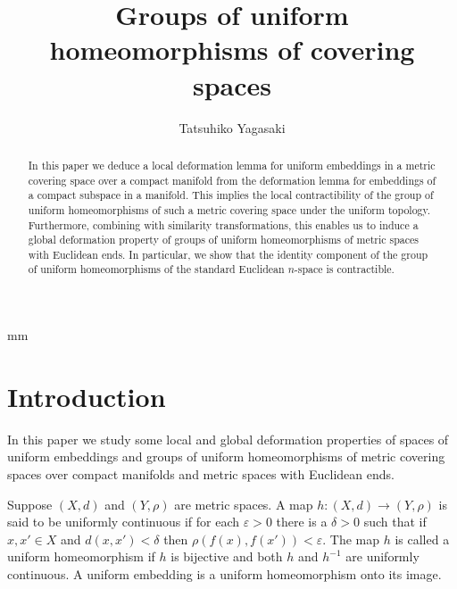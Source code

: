 \documentclass[11pt, fleqn]{amsart}
\theoremstyle{definition}
\newcommand{\e}{\varepsilon}
\begin{document}
 mm

\thispagestyle{empty}


\title[The groups of uniform homeomorphisms]{Groups of uniform homeomorphisms of covering spaces} 

\author[Tatsuhiko Yagasaki]{Tatsuhiko Yagasaki}
\address{Graduate School of Science and Technology, Kyoto Institute of Technology, Kyoto, 606-8585, Japan}


\maketitle

\begin{abstract} 
In this paper we deduce a local deformation lemma for uniform embeddings in a metric covering space over a compact manifold 
from the deformation lemma for embeddings of a compact subspace in a manifold. 
This implies the local contractibility of the group of uniform homeomorphisms of such a metric covering space under the uniform topology. 
Furthermore, combining with similarity transformations, this enables us to induce  
a global deformation property of groups of uniform homeomorphisms of metric spaces with Euclidean ends.
In particular, we show that the identity component of the group of uniform homeomorphisms of the standard Euclidean $n$-space is contractible. 
\end{abstract} 

\section{Introduction}

In this paper we study some local and global deformation properties of spaces of uniform embeddings and 
groups of uniform homeomorphisms of metric covering spaces over compact manifolds and metric spaces with Euclidean ends. 

Suppose $(X,d)$ and $(Y, \rho)$ are metric spaces. 
A map $h : (X,d) \to (Y, \rho)$ is said to be uniformly continuous if for each $\e > 0$ there is a $\delta > 0$ such that 
if $x,x' \in X$ and $d(x,x') < \delta$ then $\rho(f(x), f(x')) < \e$. 
The map $h$ is called a uniform homeomorphism if $h$ is bijective and both $h$ and $h^{-1}$ are uniformly continuous. 
A uniform embedding is a uniform homeomorphism onto its image. 
\end{document}
